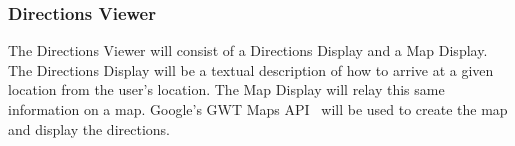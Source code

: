 \subsubsection{Directions Viewer}

The Directions Viewer will consist of a Directions Display and a Map Display. The  Directions Display will be a textual
description of how to arrive at a given location from the user's location. The Map Display will relay 
this same information on a map. Google's GWT Maps API~\cite{gmaps} will be used to create the map and display the directions.


